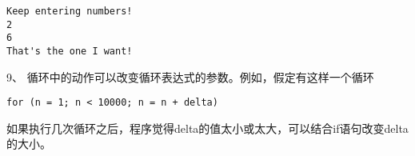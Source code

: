 \begin{frame}[fragile]
  
\end{frame}

\begin{frame}[fragile]
\begin{lstlisting}
Keep entering numbers!
2
6
That's the one I want!
\end{lstlisting}
\end{frame}

\begin{frame}[fragile]
9、 循环中的动作可以改变循环表达式的参数。例如，假定有这样一个循环
\begin{lstlisting}
for (n = 1; n < 10000; n = n + delta)
\end{lstlisting}
如果执行几次循环之后，程序觉得delta的值太小或太大，可以结合if语句改变delta的大小。
\end{frame}


